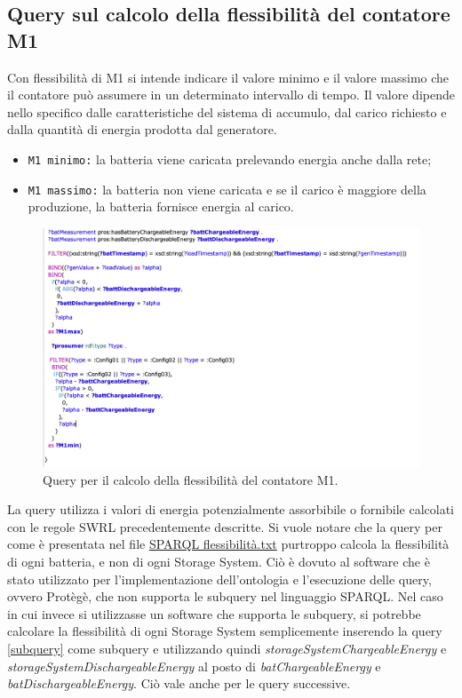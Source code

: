 \subsection{Query sul calcolo della flessibilità del contatore M1}

Con flessibilità di M1 si intende indicare il valore minimo e il valore massimo che il contatore può assumere in un determinato intervallo di tempo.
Il valore dipende nello specifico dalle caratteristiche del sistema di accumulo, dal carico richiesto e dalla quantità di energia prodotta dal generatore.
\begin{itemize}
    \item \texttt{M1 minimo:} la batteria viene caricata prelevando energia anche dalla rete;
    \item \texttt{M1 massimo:} la batteria non viene caricata e se il carico è maggiore della produzione, la batteria fornisce energia al carico.
\end{itemize}

\begin{figure}[H]
    \centering
    \includegraphics[width=15cm]{images/query_flessibilita.png}
    \caption{Query per il calcolo della flessibilità del contatore M1.}
    \label{fig:query_flessibilita}
\end{figure}

La query utilizza i valori di energia potenzialmente assorbibile o fornibile calcolati con le regole SWRL precedentemente descritte.
Si vuole notare che la query per come è presentata nel file \href{https://github.com/19eddie/SemanticWeb-Assignment02-03/blob/main/SPARQL%20flessibilit%C3%A0.txt}{SPARQL flessibilità.txt} 
purtroppo calcola la flessibilità di ogni batteria, e non di ogni Storage System.
Ciò è dovuto al software che è stato utilizzato per l'implementazione dell'ontologia e l'esecuzione delle query, ovvero Protègè,
che non supporta le subquery nel linguaggio SPARQL.
Nel caso in cui invece si utilizzasse un software che supporta le subquery, si potrebbe calcolare la flessibilità di ogni Storage System semplicemente inserendo la query \ref{subquery} come subquery e utilizzando quindi \textit{storageSystemChargeableEnergy} e \textit{storageSystemDischargeableEnergy} al posto di \textit{batChargeableEnergy} e \textit{batDischargeableEnergy}.
Ciò vale anche per le query successive.

